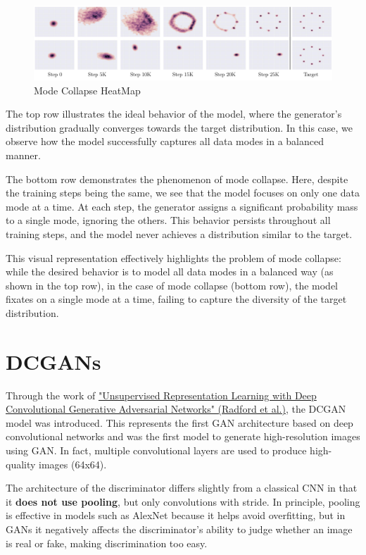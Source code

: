 \begin{figure}[!htbp]
    \centering
    \includegraphics[width=\linewidth]{tikz/chapter9 - Mode Collapse HeatMap.pdf}
    \caption{Mode Collapse HeatMap}
\end{figure}

The top row illustrates the ideal behavior of the model, where the generator's distribution gradually converges towards the target distribution. In this case, we observe how the model successfully captures all data modes in a balanced manner.
    
The bottom row demonstrates the phenomenon of mode collapse. Here, despite the training steps being the same, we see that the model focuses on only one data mode at a time. At each step, the generator assigns a significant probability mass to a single mode, ignoring the others. This behavior persists throughout all training steps, and the model never achieves a distribution similar to the target.

This visual representation effectively highlights the problem of mode collapse: while the desired behavior is to model all data modes in a balanced way (as shown in the top row), in the case of mode collapse (bottom row), the model fixates on a single mode at a time, failing to capture the diversity of the target distribution.

\section{DCGANs}

Through the work of \href{https://arxiv.org/pdf/1511.06434}{"Unsupervised Representation Learning with Deep Convolutional Generative Adversarial Networks" (Radford et al.)}, the DCGAN model was introduced. This represents the first GAN architecture based on deep convolutional networks and was the first model to generate high-resolution images using GAN. In fact, multiple convolutional layers are used to produce high-quality images (64x64).

The architecture of the discriminator differs slightly from a classical CNN in that it \textbf{does not use pooling}, but only convolutions with stride. In principle, pooling is effective in models such as AlexNet because it helps avoid overfitting, but in GANs it negatively affects the discriminator's ability to judge whether an image is real or fake, making discrimination too easy.

